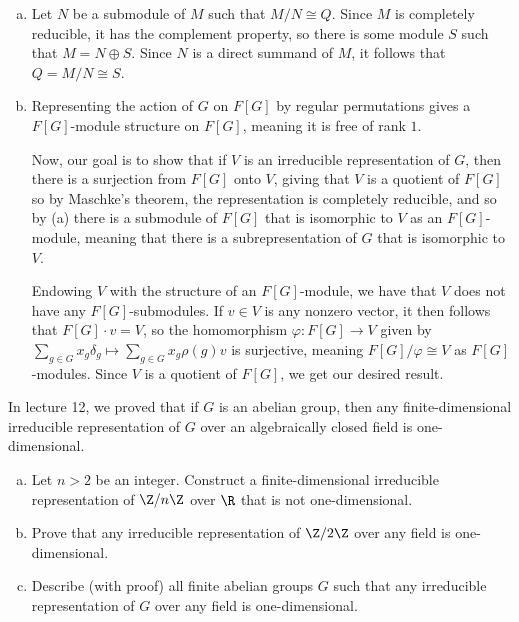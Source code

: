 \documentclass[10pt]{mypackage}
\begin{document}
\begin{solution}\hfill
  \begin{enumerate}[(a)]
    \item Let $N$ be a submodule of $M$ such that $M/N\cong Q$. Since $M$ is completely reducible, it has the complement property, so there is some module $S$ such that $M = N\oplus S$. Since $N$ is a direct summand of $M$, it follows that $Q = M/N\cong S$.
    \item Representing the action of $G$ on $F[G]$ by regular permutations gives a $F[G]$-module structure on $F[G]$, meaning it is free of rank $1$.

      Now, our goal is to show that if $V$ is an irreducible representation of $G$, then there is a surjection from $F[G]$ onto $V$, giving that $V$ is a quotient of $F[G]$ so by Maschke's theorem, the representation is completely reducible, and so by (a) there is a submodule of $F[G]$ that is isomorphic to $V$ as an $F[G]$-module, meaning that there is a subrepresentation of $G$ that is isomorphic to $V$.

      Endowing $V$ with the structure of an $F[G]$-module, we have that $V$ does not have any $F[G]$-submodules. If $v\in V$ is any nonzero vector, it then follows that $F[G]\cdot v = V$, so the homomorphism $\varphi\colon F[G]\rightarrow V$ given by $\sum_{g\in G}x_g \delta_g\mapsto \sum_{g\in G}x_g\rho(g)v$ is surjective, meaning $F[G]/\varphi\cong V$ as $F[G]$-modules. Since $V$ is a quotient of $F[G]$, we get our desired result.
  \end{enumerate}
\end{solution}
\begin{problem}[Problem 5]
  In lecture 12, we proved that if $G$ is an abelian group, then any finite-dimensional irreducible representation of $G$ over an algebraically closed field is one-dimensional.
  \begin{enumerate}[(a)]
    \item Let $n > 2$ be an integer. Construct a finite-dimensional irreducible representation of $\Z/n\Z$ over $\R$ that is not one-dimensional.
    \item Prove that any irreducible representation of $\Z/2\Z$ over any field is one-dimensional.
    \item Describe (with proof) all finite abelian groups $G$ such that any irreducible representation of $G$ over any field is one-dimensional.
  \end{enumerate}
\end{problem}
\end{document}
